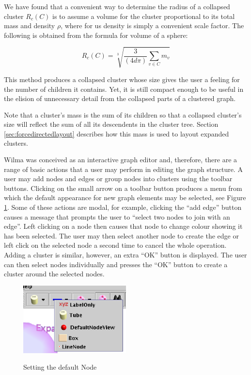 \documentclass[runningheads]{cl2emult}
\begin{document}
We have found that a convenient way to determine the radius of a collapsed cluster
$R_c(C)$ is to assume a volume for the cluster proportional to its
total mass and density $\rho$, where for us density is simply a convenient scale
factor.  The following is obtained from the formula for volume of a
sphere:

\begin{equation}
R_c(C) = \sqrt[3]{\frac{3}{(4d\pi)}\sum_{v \in C}m_v}
\end{equation}

This method produces a collapsed cluster whose size gives the user a
feeling for the number of children it contains.  Yet, it is still
compact enough to be useful in the elision of unnecessary detail from
the collapsed parts of a clustered graph.

Note that a cluster's mass is the sum of its children so that a
collapsed cluster's size will reflect the sum of all its descendents
in the cluster tree.  Section \ref{sec:forcedirectedlayout} describes
how this mass is used to layout expanded clusters.

Wilma was conceived as an interactive graph editor and, therefore, there
are a range of basic actions that a user may perform in editing the
graph structure.  A user may add nodes and edges or group nodes into
clusters using the toolbar buttons.  Clicking on the small arrow on a
toolbar button produces a menu from which the default appearance for
new 
graph elements may be selected, see Figure
\ref{fig-defaultnode}.
Some of these actions are modal, for example, clicking the ``add
edge'' button causes a message that prompts the user to ``select two
nodes to join with an edge''.  Left clicking on a node then causes that node
to change colour showing it has been selected.  The user may then
select another node to create the edge or left click on the selected node a
second time to cancel the whole operation.  Adding a cluster is
similar, however, an extra ``OK'' button is displayed.  The user can
then select nodes individually and presses the ``OK'' button to create
a cluster around the selected nodes.
\begin{figure}
\begin{center}
  \label{fig-defaultnode}
  \includegraphics[width=0.5\textwidth]{figures/defaultnode.eps}
  \caption{Setting the default Node}
\end{center}
\end{figure}
\end{document}
